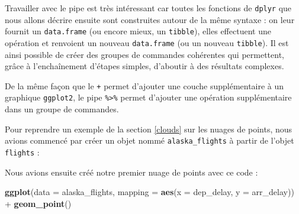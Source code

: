 \documentclass[a4paperpaper,]{article}
\newenvironment{Shaded}{\begin{snugshade}}{\end{snugshade}}
\newcommand{\CommentTok}[1]{\textcolor[rgb]{0.54,0.53,0.53}{#1}}
\newcommand{\DataTypeTok}[1]{\textcolor[rgb]{0.00,0.34,0.68}{#1}}
\newcommand{\KeywordTok}[1]{\textcolor[rgb]{0.12,0.11,0.11}{\textbf{#1}}}
\newcommand{\NormalTok}[1]{\textcolor[rgb]{0.12,0.11,0.11}{#1}}
\newcommand{\OperatorTok}[1]{\textcolor[rgb]{0.12,0.11,0.11}{#1}}
\newcommand{\StringTok}[1]{\textcolor[rgb]{0.75,0.01,0.01}{#1}}
\begin{document}
\begin{Shaded}
\end{Shaded}

Travailler avec le pipe est très intéressant car toutes les fonctions de \texttt{dplyr} que nous allons décrire ensuite sont construites autour de la même syntaxe : on leur fournit un \texttt{data.frame} (ou encore mieux, un \texttt{tibble}), elles effectuent une opération et renvoient un nouveau \texttt{data.frame} (ou un nouveau \texttt{tibble}). Il est ainsi possible de créer des groupes de commandes cohérentes qui permettent, grâce à l'enchaînement d'étapes simples, d'aboutir à des résultats complexes.

De la même façon que le \texttt{+} permet d'ajouter une couche supplémentaire à un graphique \texttt{ggplot2}, le pipe \texttt{\%\textgreater{}\%} permet d'ajouter une opération supplémentaire dans un groupe de commandes.

Pour reprendre un exemple de la section \ref{clouds} sur les nuages de points, nous avions commencé par créer un objet nommé \texttt{alaska\_flights} à partir de l'objet \texttt{flights} :

\begin{Shaded}
\end{Shaded}

Nous avions ensuite créé notre premier nuage de points avec ce code :

\begin{Shaded}
\begin{Highlighting}[]
\KeywordTok{ggplot}\NormalTok{(}\DataTypeTok{data =}\NormalTok{ alaska_flights, }\DataTypeTok{mapping =} \KeywordTok{aes}\NormalTok{(}\DataTypeTok{x =}\NormalTok{ dep_delay, }\DataTypeTok{y =}\NormalTok{ arr_delay)) }\OperatorTok{+}\StringTok{ }
\StringTok{  }\KeywordTok{geom_point}\NormalTok{()}
\end{Highlighting}
\end{Shaded}
\end{document}
